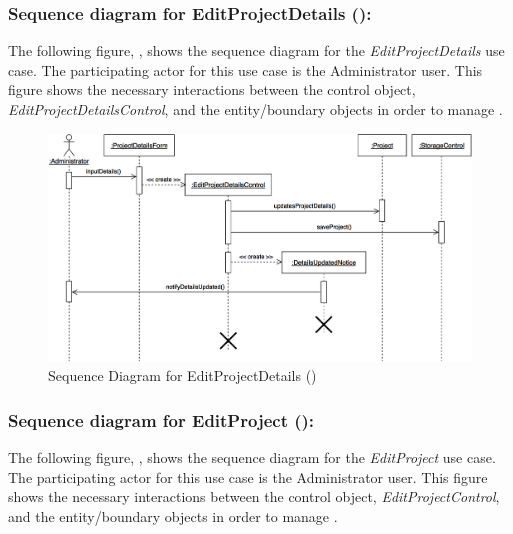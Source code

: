 \documentclass[12pt,letterpaper]{article}
\begin{document}
\subsubsection*{Sequence diagram for EditProjectDetails ():}

The following figure, , shows the sequence diagram for the {\it EditProjectDetails} use case. The participating actor for this use case is
the Administrator user. This figure shows the necessary interactions between the control object, {\it EditProjectDetailsControl}, and the
entity/boundary objects in order to manage .

\begin{figure}[H]
	\centering{}
	\includegraphics[scale=0.25]{imgs/seq/edit-project-details.png}
	\caption[ - Sequence Diagram for EditProjectDetails]{Sequence Diagram for EditProjectDetails ()}
\end{figure}

\subsubsection*{Sequence diagram for EditProject ():}

The following figure, , shows the sequence diagram for the {\it EditProject} use case. The participating actor for this use case is
the Administrator user. This figure shows the necessary interactions between the control object, {\it EditProjectControl}, and the
entity/boundary objects in order to manage .
\end{document}
